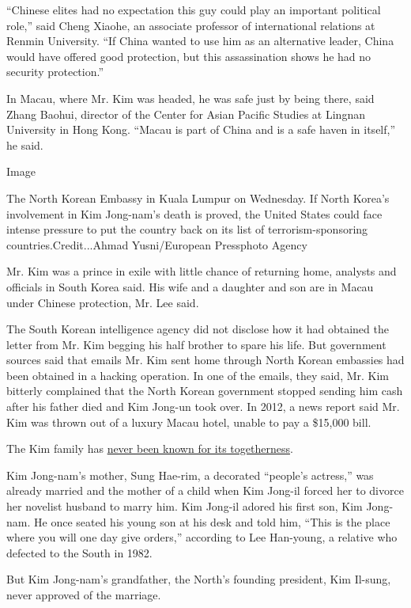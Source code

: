 ``Chinese elites had no expectation this guy could play an important
political role,'' said Cheng Xiaohe, an associate professor of
international relations at Renmin University. ``If China wanted to use
him as an alternative leader, China would have offered good protection,
but this assassination shows he had no security protection.''

In Macau, where Mr. Kim was headed, he was safe just by being there,
said Zhang Baohui, director of the Center for Asian Pacific Studies at
Lingnan University in Hong Kong. ``Macau is part of China and is a safe
haven in itself,'' he said.

Image

The North Korean Embassy in Kuala Lumpur on Wednesday. If North Korea's
involvement in Kim Jong-nam's death is proved, the United States could
face intense pressure to put the country back on its list of
terrorism-sponsoring countries.Credit...Ahmad Yusni/European Pressphoto
Agency

Mr. Kim was a prince in exile with little chance of returning home,
analysts and officials in South Korea said. His wife and a daughter and
son are in Macau under Chinese protection, Mr. Lee said.

The South Korean intelligence agency did not disclose how it had
obtained the letter from Mr. Kim begging his half brother to spare his
life. But government sources said that emails Mr. Kim sent home through
North Korean embassies had been obtained in a hacking operation. In one
of the emails, they said, Mr. Kim bitterly complained that the North
Korean government stopped sending him cash after his father died and Kim
Jong-un took over. In 2012, a news report said Mr. Kim was thrown out of
a luxury Macau hotel, unable to pay a \$15,000 bill.

The Kim family has
\href{http://www.nytimes.com/2011/12/23/world/asia/family-intrigue-shadows-north-koreas-secretive-dynasty.html}{never
been known for its togetherness}.

Kim Jong-nam's mother, Sung Hae-rim, a decorated ``people's actress,''
was already married and the mother of a child when Kim Jong-il forced
her to divorce her novelist husband to marry him. Kim Jong-il adored his
first son, Kim Jong-nam. He once seated his young son at his desk and
told him, ``This is the place where you will one day give orders,''
according to Lee Han-young, a relative who defected to the South in
1982.

But Kim Jong-nam's grandfather, the North's founding president, Kim
Il-sung, never approved of the marriage.


